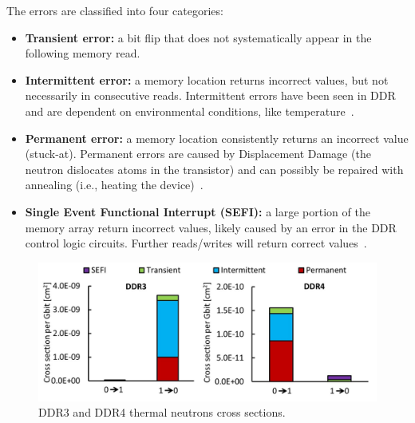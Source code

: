 The errors are classified into four categories: 
\begin{itemize}[noitemsep]
\item \textbf{Transient error:} a bit flip that does not systematically appear in the following memory read. %
\item \textbf{Intermittent error:} a memory location returns incorrect values, but not necessarily in consecutive reads. Intermittent errors have been seen in DDR and are dependent on environmental conditions, like temperature~\cite{constantinescu2008intermittent}.
\item \textbf{Permanent error:} a memory location consistently returns an incorrect value (stuck-at). Permanent errors are caused by Displacement Damage (the neutron dislocates atoms in the transistor) and can possibly be repaired with annealing (i.e., heating the device)~\cite{quinnDDR,srour2003}.

\item \textbf{Single Event Functional Interrupt (SEFI):}  a large portion of the memory array return incorrect values, likely caused by an error in the DDR control logic circuits. Further reads/writes will return correct values~\cite{electronic1996test}.

\end{itemize}

\begin{figure}[tb]
\centering
\includegraphics[width=1.00\columnwidth]{./data/plots_final/cs_DDR.jpg}
\caption{DDR3 and DDR4 thermal neutrons cross sections.}
\label{DDRCS}
\end{figure}

